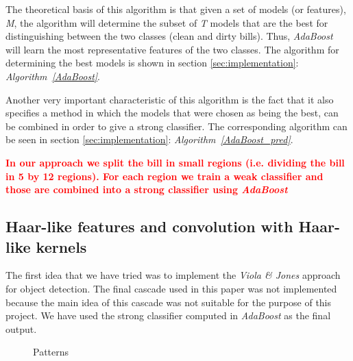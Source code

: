 \documentclass[11pt,twocolumn]{article}
\newcommand{\todo}[1]{\textcolor{red}{\textbf{#1}}}
\begin{document}
			The theoretical basis of this algorithm is that given a set of models (or features), \emph{M}, the algorithm will determine the subset of \emph{T} models that	 are the best for distinguishing between the two classes (clean and dirty bills). Thus, \emph{AdaBoost} will learn the most representative features of the two classes. The algorithm for determining the best models is shown in section \ref{sec:implementation}: \emph{Algorithm~\ref{AdaBoost}}.
			
			Another very important characteristic of this algorithm is the fact that it also specifies a method in which the models that were chosen as being the best, can be combined in order to give a strong classifier. The corresponding algorithm can be seen in section \ref{sec:implementation}: \emph{Algorithm~\ref{AdaBoost_pred}}.
			
			\todo{In our approach we split the bill in small regions (i.e. dividing the bill in 5 by 12 regions). For each region we train a weak classifier and those are combined into a strong classifier using \emph{AdaBoost}}

		\subsection{Haar-like features and convolution with Haar-like kernels}\label{sec:Haar}
			The first idea that we have tried was to implement the \emph{Viola \& Jones} approach for object detection. The final cascade used in this paper was not implemented because the main idea of this cascade was not suitable for the purpose of this project. We have used the strong classifier computed in \emph{AdaBoost} as the final output.
			
			\begin{figure}[!hbtp]
				\caption{Patterns}
				\label{patterns}
			\end{figure}
			
\end{document}
